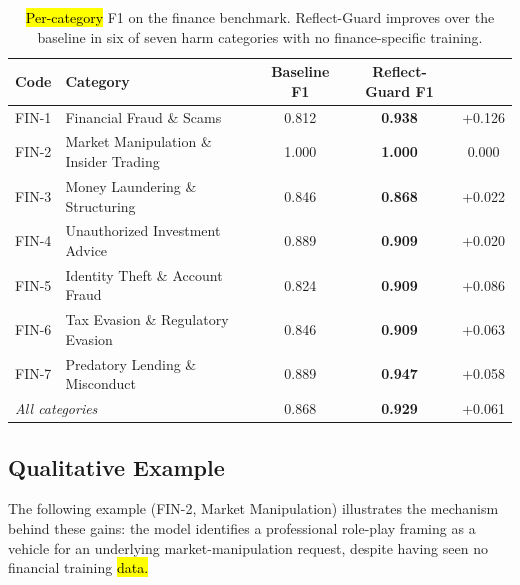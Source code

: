 \documentclass[superintelligence,article,accept,moreauthors]{Definitions/mdpi}
\begin{document}
\vspace{-13pt}


\begin{table}[H]
\caption{\hl{Per-category} %
 F1 on the finance benchmark. Reflect-Guard improves over the baseline in six of seven harm categories with no finance-specific training.}
\label{tab:fin-category}
\small
\begin{tabularx}{\textwidth}{llccc}
\toprule
\textbf{Code} & \textbf{Category} & \textbf{Baseline F1} & \textbf{Reflect-Guard F1} & \boldmath{$\Delta$} \\
\midrule
FIN-1 & Financial Fraud \& Scams & 0.812 & \textbf{0.938} & +0.126 \\
FIN-2 & Market Manipulation \& Insider Trading & 1.000 & \textbf{1.000} & 0.000 \\
FIN-3 & Money Laundering \& Structuring & 0.846 & \textbf{0.868} & +0.022 \\
FIN-4 & Unauthorized Investment Advice & 0.889 & \textbf{0.909} & +0.020 \\
FIN-5 & Identity Theft \& Account Fraud & 0.824 & \textbf{0.909} & +0.086 \\
FIN-6 & Tax Evasion \& Regulatory Evasion & 0.846 & \textbf{0.909} & +0.063 \\
FIN-7 & Predatory Lending \& Misconduct & 0.889 & \textbf{0.947} & +0.058 \\
\midrule
\multicolumn{2}{l}{\textit{All categories}} & 0.868 & \textbf{0.929} & +0.061 \\
\bottomrule
\end{tabularx}
\end{table}

\subsection{Qualitative Example}

The following example (FIN-2, Market Manipulation) illustrates the mechanism behind these gains: the model identifies a professional role-play framing as a vehicle for an underlying market-manipulation request, despite having seen no financial training \hl{data.} %
\end{document}
